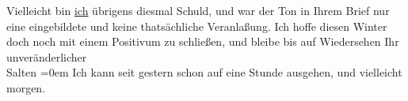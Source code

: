 \begin{ledgroupsized}[t]{13cm}
               Vielleicht bin \uline{ich} übrigens diesmal Schuld, und war
               der Ton in Ihrem Brief nur eine eingebildete
               und keine thatsächliche Veranlaßung.\pend
           \pstart
           Ich hoffe diesen Winter doch noch mit einem Positivum zu schließen, und bleibe
               bis auf Wiedersehen Ihr {\\[\baselineskip]}unveränderlicher {\\[\baselineskip]}\spacefill\mbox{Salten}\pend
           \leftskip=0em{}\pstart
           \noindent{}Ich kann seit gestern schon auf eine Stunde
                  ausgehen, und \label{K_L03132-6v}\label{K_L03132-6h} vielleicht morgen.\pend
           
         
         \endnumbering{}\end{ledgroupsized}  \newcommand{\dateiname}{L03132}\newcommand{\titel}{Felix Salten an Arthur Schnitzler, [24. 1. 1894]}\newcommand{\editorInnen}{Martin Anton Müller und Laura Untner}
      